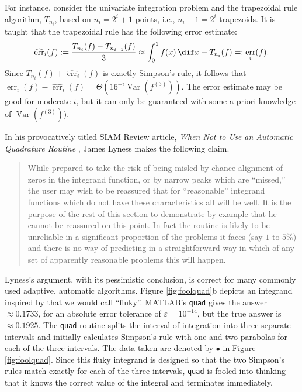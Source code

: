 \documentclass[]{elsarticle}
\DeclareMathOperator{\Var}{Var}
\DeclareMathOperator{\err}{err}
\newcommand{\herr}{\widehat{\err}}
\theoremstyle{definition}
\theoremstyle{remark}
\begin{document}
For instance, consider the univariate integration problem and the trapezoidal rule algorithm, $T_{n_i}$, based on $n_i=2^i+1$ points, i.e., $n_i-1=2^i$ trapezoids.  It is taught that the trapezoidal rule has the following error estimate:
\begin{equation} \label{traperrest}
\herr_i(f):=\frac{T_{n_{i}}(f)-T_{n_{i-1}}(f)}{3} \approx \int_0^1 f(x) \, \dif x - T_{n_i}(f) =:\err_i(f).
\end{equation}
Since $T_{n_i}(f)+ \herr_i(f)$ is exactly Simpson's rule, it follows that $\err_i(f) -\herr_i(f) = \Theta(16^{-i} \Var(f^{(3)}))$.  The error estimate may be good for moderate $i$, but it can only be guaranteed with some a priori knowledge of $\Var(f^{(3)}))$.

In his provocatively titled SIAM Review article, \emph{When Not to Use an Automatic Quadrature Routine} \cite[p.\ 69]{Lyn83}, James Lyness makes the following claim.
\begin{quote}
While prepared to take the risk of being misled by chance alignment of zeros in the integrand function, or by narrow peaks which are ``missed,'' the user may wish to be reassured that for ``reasonable'' integrand functions which do not have these characteristics all will be well. It is the purpose of the rest of this section to demonstrate by example that he cannot be reassured on this point. In fact the routine is likely to be unreliable in a significant proportion of the problems it faces (say $1$ to $5\%$) and there is no way of predicting in a straightforward way in which of any set of apparently reasonable problems this will happen.
\end{quote}

Lyness's argument, with its pessimistic conclusion, is correct for many commonly used adaptive, automatic algorithms.  Figure \ref{fig:foolquad}b depicts an integrand inspired by \cite{Lyn83} that we would call ``fluky''.  MATLAB's {\tt quad} gives the answer $\approx 0.1733$, for an absolute error tolerance of $\varepsilon=10^{-14}$, but the true answer is $\approx 0.1925$.  The {\tt quad} routine splits the interval of integration into three separate intervals and initially calculates Simpson's rule with one and two parabolas for each of the three intervals.  The data taken are denoted by $\bullet$ in Figure \ref{fig:foolquad}.  Since this fluky integrand is designed so that the two Simpson's rules match exactly for each of the three intervals, {\tt quad} is fooled into thinking that it knows the correct value of the integral and terminates immediately.
\end{document}

